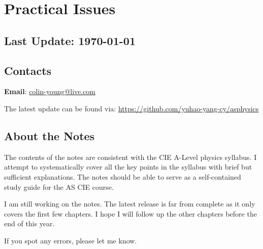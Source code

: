 \section*{Practical Issues}

\subsection*{Last Update: \today}


\subsection*{Contacts}
\textbf{Email}: \url{colin-young@live.com}

The latest update can be found via: \url{https://github.com/yuhao-yang-cy/asphysics}

\subsection*{About the Notes}

The contents of the notes are consistent with the CIE A-Level physics syllabus. I attempt to systematically cover all the key points in the syllabus with brief but sufficient explanations. The notes should be able to serve as a self-contained study guide for the AS CIE course.

I am still working on the notes. The latest release is far from complete as it only covers the first few chapters. I hope I will follow up the other chapters before the end of this year.

If you spot any errors, please let me know.

